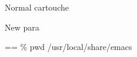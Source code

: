 \documentclass{book}
\makeatletter
\newenvironment{Texinfopreformatted}{%
  \par\GNUTobeylines\obeyspaces\frenchspacing\parskip=\z@\parindent=\z@}{}
{\catcode`\^^M=13 \gdef\GNUTobeylines{\catcode`\^^M=13 \def^^M{\null\par}}}
\newenvironment{Texinfoindented}{\begin{list}{}{}\item\relax}{\end{list}}
\renewcommand{\_}{\Texinfounderscore\discretionary{}{}{}}
\makeatother
\begin{document}
\begin{Texinfocartouche}
Normal cartouche

New para
\end{Texinfocartouche}

\begin{Texinfocartouche}
\begin{Texinfoindented}
\begin{Texinfopreformatted}%
\ttfamily \% pwd
/usr/local/share/emacs
\end{Texinfopreformatted}
\end{Texinfoindented}
\end{Texinfocartouche}
\end{document}
